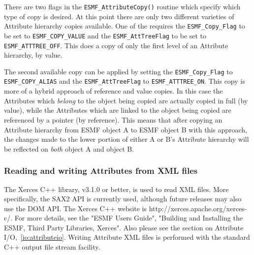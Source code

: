 \begin{sloppypar}
There are two flags in the {\tt ESMF\_AttributeCopy()} routine which specify which type of copy is desired.  At this point there are only two different varieties of Attribute hierarchy copies available.  One of the requires the {\tt ESMF\_Copy\_Flag} to be set to {\tt ESMF\_COPY\_VALUE} and the {\tt ESMF\_AttTreeFlag} to be set to {\tt ESMF\_ATTTREE\_OFF}.  This does a copy of only the first level of an Attribute hierarchy, by value.
\end{sloppypar}

The second available copy can be applied by setting the {\tt ESMF\_Copy\_Flag} to {\tt ESMF\_COPY\_ALIAS} and the {\tt ESMF\_AttTreeFlag} to {\tt ESMF\_ATTTREE\_ON}.  This copy is more of a hybrid approach of reference and value copies.  In this case the Attributes which {\it belong} to the object being copied are actually copied in full (by value), while the Attributes which are linked to the object being copied are referenced by a pointer (by reference).  This means that after copying an Attribute hierarchy from ESMF object A to ESMF object B with this approach, the changes made to the lower portion of either A or B's Attribute hierarchy will be reflected on {\it both} object A and object B.

\subsubsection{Reading and writing Attributes from XML files}
\label{Att:Xerces}

\begin{sloppypar}
The Xerces C++ library, v3.1.0 or better, is used to read XML files.  
More specifically, the SAX2 API is currently used, although future releases may 
also use the DOM API.  The Xerces C++ website is 
http://xerces.apache.org/xerces-c/.  For more details, see the 
"ESMF Users Guide", "Building and Installing the ESMF, Third Party Libraries,
Xerces".  Also please see the section on Attribute I/O,~\ref{io:attributeio}.  
Writing Attribute XML files is performed with the standard C++ output file 
stream facility.
\end{sloppypar}
